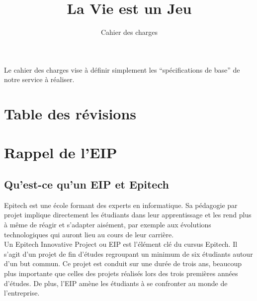 \documentclass{life-fr}
\begin{document}
\title{La Vie est un Jeu}
\subtitle{Cahier des charges}

\summary
{
  Le cahier des charges vise à définir simplement les ``spécifications de base'' de notre service à réaliser.
}

\maketitle

\chapter*{Table des révisions}

\listofrevisions

\newpage

\tableofcontents

\chapter{Rappel de l'EIP}
\section{Qu'est-ce qu'un EIP et Epitech}
Epitech est une école formant des experts en informatique. Sa pédagogie par projet implique directement les étudiants dans leur apprentissage et les rend plus à même de réagir et s'adapter aisément, par exemple aux évolutions technologiques qui auront lieu au cours de leur carrière.\\

Un Epitech Innovative Project ou EIP est l'élément clé du cursus Epitech. Il s'agit d'un projet de fin d'études regroupant un minimum de six étudiants autour d'un but commun. Ce projet est conduit sur une durée de trois ans, beaucoup plus importante que celles des projets réalisés lors des trois premières années d'études. De plus, l'EIP amène les étudiants à se confronter au monde de l'entreprise.
\end{document}
